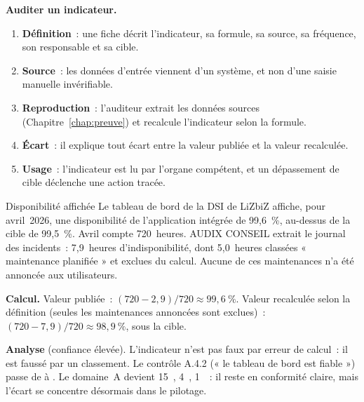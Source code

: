 \begin{boxprocedure}
\textbf{Auditer un indicateur.}
\begin{enumerate}
    \item \textbf{Définition}~: une fiche décrit l'indicateur, sa formule,
          sa source, sa fréquence, son responsable et sa cible.
    \item \textbf{Source}~: les données d'entrée viennent d'un système, et
          non d'une saisie manuelle invérifiable.
    \item \textbf{Reproduction}~: l'auditeur extrait les données sources
          (Chapitre~\ref{chap:preuve}) et recalcule l'indicateur selon la
          formule.
    \item \textbf{Écart}~: il explique tout écart entre la valeur publiée et
          la valeur recalculée.
    \item \textbf{Usage}~: l'indicateur est lu par l'organe compétent, et un
          dépassement de cible déclenche une action tracée.
\end{enumerate}
\end{boxprocedure}

\begin{boxlecture}{Disponibilité affichée}
Le tableau de bord de la DSI de LiZbiZ affiche, pour avril~2026, une
disponibilité de l'application intégrée de 99,6~\%, au-dessus de la cible
de 99,5~\%. Avril compte 720~heures. AUDIX CONSEIL extrait le journal des
incidents~: 7,9~heures d'indisponibilité, dont 5,0~heures classées
« maintenance planifiée » et exclues du calcul. Aucune de ces
maintenances n'a été annoncée aux utilisateurs.

\medskip
\textbf{Calcul.} Valeur publiée~: $(720 - 2{,}9) / 720 \approx 99{,}6~\%$.
Valeur recalculée selon la définition (seules les maintenances annoncées
sont exclues)~: $(720 - 7{,}9) / 720 \approx 98{,}9~\%$, sous la cible.

\medskip
\textbf{Analyse} (confiance élevée). L'indicateur n'est pas faux par erreur
de calcul~: il est faussé par un classement. Le contrôle A.4.2
(« le tableau de bord est fiable ») passe de \OUI{} à \NON{}. Le
domaine~A devient 15~\OUI{}, 4~\NON{}, 1~\NEK{}~: il reste en conformité
claire, mais l'écart se concentre désormais dans le pilotage.

\medskip
\hfill{}
\end{boxlecture}

